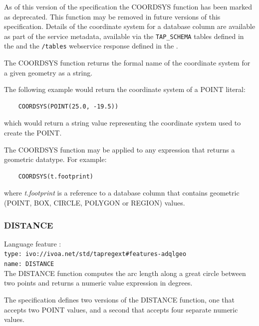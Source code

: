 \documentclass[11pt,a4paper]{ivoa}
\begin{document}
As of this version of the specification the COORDSYS function has
been marked as deprecated. This function may be removed in future versions
of this specification.
Details of the coordinate system for a database column are available as part of
the service metadata, available via the \verb:TAP_SCHEMA: tables defined in the
\TAPSpec{} and the \verb:/tables: webservice response defined in the \VOSISpec{}.


The COORDSYS function returns the formal name of the coordinate system for
a given geometry as a string.

The following example would return the coordinate system of a POINT literal:
\begin{verbatim}
    COORDSYS(POINT(25.0, -19.5))
\end{verbatim}
\noindent
which would return a string value representing the coordinate system used
to create the POINT.

The COORDSYS function may be applied to any expression that returns a
geometric datatype. For example:
\begin{verbatim}
    COORDSYS(t.footprint)
\end{verbatim}
\noindent
where \textit{t.footprint} is a reference to a database column that
contains geometric (POINT, BOX, CIRCLE, POLYGON or REGION) values.

\subsubsection{DISTANCE}
\label{sec:functions.geom.distance}
{\footnotesize Language feature :}\\
{\footnotesize \verb|type: ivo://ivoa.net/std/tapregext#features-adqlgeo|}\\
{\footnotesize \verb|name: DISTANCE|}\\

The DISTANCE function computes the arc length along a great circle between two
points and returns a numeric value expression in degrees.

The specification defines two versions of the DISTANCE function, one that
accepts two POINT values, and a second that accepts four separate numeric
values.
\end{document}
